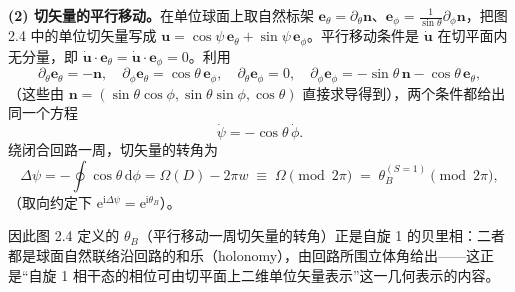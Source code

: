 \textbf{(2) 切矢量的平行移动。}在单位球面上取自然标架 $\pmb e_\theta=\partial_\theta\pmb n$、$\pmb e_\phi=\frac{1}{\sin\theta}\partial_\phi\pmb n$，把图 2.4 中的单位切矢量写成 $\pmb u=\cos\psi\,\pmb e_\theta+\sin\psi\,\pmb e_\phi$。平行移动条件是 $\dot{\pmb u}$ 在切平面内无分量，即 $\dot{\pmb u}\cdot\pmb e_\theta=\dot{\pmb u}\cdot\pmb e_\phi=0$。利用
\begin{equation*}
\partial_\theta\pmb e_\theta=-\pmb n,\quad
\partial_\phi\pmb e_\theta=\cos\theta\,\pmb e_\phi,\quad
\partial_\theta\pmb e_\phi=0,\quad
\partial_\phi\pmb e_\phi=-\sin\theta\,\pmb n-\cos\theta\,\pmb e_\theta,
\end{equation*}
（这些由 $\pmb n=(\sin\theta\cos\phi,\sin\theta\sin\phi,\cos\theta)$ 直接求导得到），两个条件都给出同一个方程
\begin{equation*}
\dot\psi=-\cos\theta\,\dot\phi .
\end{equation*}
绕闭合回路一周，切矢量的转角为
\begin{equation*}
\Delta\psi=-\oint\cos\theta\,\mathrm{d}\phi=\Omega(D)-2\pi w\;\equiv\;\Omega\pmod{2\pi}
\;=\;\theta_B^{(S=1)}\pmod{2\pi},
\end{equation*}
（取向约定下 $\mathrm{e}^{\mathrm{i}\Delta\psi}=\mathrm{e}^{\mathrm{i}\theta_B}$）。

因此图 2.4 定义的 $\theta_B$（平行移动一周切矢量的转角）正是自旋 1 的贝里相：二者都是球面自然联络沿回路的和乐（holonomy），由回路所围立体角给出——这正是“自旋 1 相干态的相位可由切平面上二维单位矢量表示”这一几何表示的内容。

